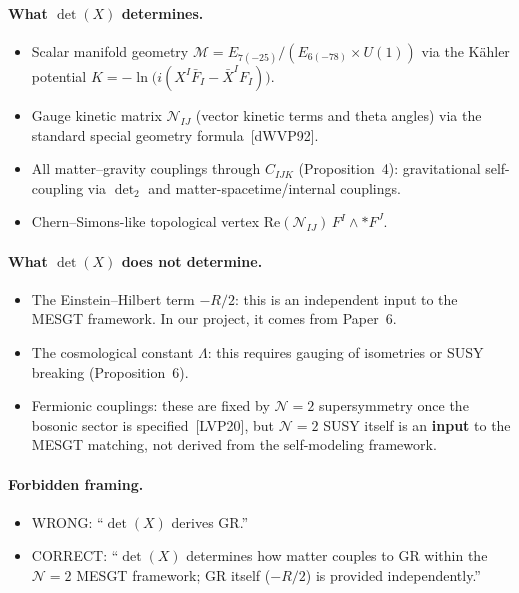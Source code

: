 \paragraph{What $\det(X)$ determines.}
\begin{itemize}
\item Scalar manifold geometry
  $\mathcal{M} = E_{7(-25)}/(E_{6(-78)} \times U(1))$
  via the K\"ahler potential
  $K = -\ln\!\bigl(i(X^I \bar{F}_I - \bar{X}^I F_I)\bigr)$.
\item Gauge kinetic matrix $\mathcal{N}_{IJ}$ (vector kinetic terms
  and theta angles) via the standard special geometry formula~[dWVP92].
\item All matter--gravity couplings through $C_{IJK}$ (Proposition~4):
  gravitational self-coupling via $\det_2$ and matter-spacetime/internal
  couplings.
\item Chern--Simons-like topological vertex $\mathrm{Re}(\mathcal{N}_{IJ})
  \, F^I \wedge {*F}^J$.
\end{itemize}

\paragraph{What $\det(X)$ does \textbf{not} determine.}
\begin{itemize}
\item The Einstein--Hilbert term $-R/2$: this is an independent input to
  the MESGT framework. In our project, it comes from Paper~6.
\item The cosmological constant $\Lambda$: this requires gauging of
  isometries or SUSY breaking (Proposition~6).
\item Fermionic couplings: these are fixed by $\mathcal{N}=2$
  supersymmetry once the bosonic sector is specified~[LVP20], but
  $\mathcal{N}=2$ SUSY itself is an \textbf{input} to the MESGT matching,
  not derived from the self-modeling framework.
\end{itemize}

\paragraph{Forbidden framing.}
\begin{itemize}
\item WRONG: ``$\det(X)$ derives GR.''
\item CORRECT: ``$\det(X)$ determines how matter couples to GR within
  the $\mathcal{N}=2$ MESGT framework; GR itself ($-R/2$) is provided
  independently.''
\end{itemize}

